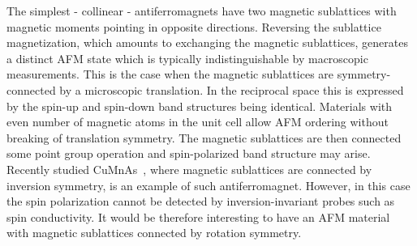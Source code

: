 \documentclass[reprint,twocolumn,superscriptaddress,secnumarabic,amssymb, nobibnotes, aps, prb]{revtex4-1}
\begin{document}
The simplest - collinear - antiferromagnets have two magnetic sublattices with
magnetic moments pointing in opposite directions. Reversing the sublattice magnetization, which amounts to exchanging the magnetic sublattices, generates a  distinct AFM state which is typically indistinguishable by macroscopic measurements.
This is the case when the magnetic sublattices are symmetry-connected
by a microscopic translation. In the reciprocal space this is expressed by the spin-up and spin-down band structures being identical.
Materials with even number of magnetic atoms in the unit cell allow AFM ordering without breaking of translation symmetry. The magnetic sublattices are then connected some point group operation and spin-polarized band structure may arise. Recently studied CuMnAs~\cite{Wadley2013}, where magnetic sublattices are connected 
by inversion symmetry, is an example of such antiferromagnet. However, in this case
the spin polarization cannot be detected by inversion-invariant probes such as spin conductivity. It would be therefore interesting to have an AFM material
with magnetic sublattices connected by rotation symmetry. 
\end{document}
